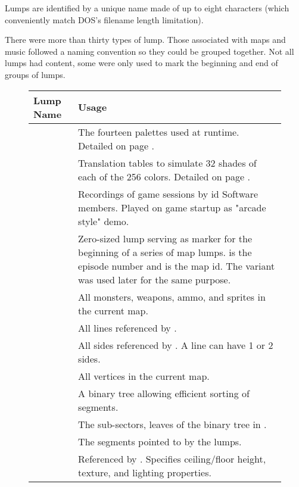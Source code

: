 Lumps are identified by a unique name made of up to eight characters (which conveniently match DOS's filename length limitation).\\
\par
{}
\par
There were more than thirty types of lump. Those associated with maps and music followed a naming convention so they could be grouped together. Not all lumps had content, some were only used to mark the beginning and end of groups of lumps.
\pagebreak

\begin{figure}[H]
\centering  
\begin{tabularx}{\textwidth}{ L{0.2}  L{0.8}}
  \toprule
  \textbf{Lump Name} &  \textbf{Usage} \\
   
  \toprule 
   & The fourteen palettes used at runtime. Detailed on page \pageref{label_palettes}. \\
   & Translation tables to simulate 32 shades of each of the 256 colors. Detailed on page \pageref{diminishedlightning}. \\
   &  Recordings of game sessions by id Software members. Played on game startup as "arcade style" demo.\\
  \toprule
   & Zero-sized lump serving as marker for the beginning of a series of map lumps.  is the episode number and  is the map id. The  variant was used later for the same purpose.\\
   & All monsters, weapons, ammo, and sprites in the current map.\\
   & All lines referenced by .\\
   & All sides referenced by . A line can have 1 or 2 sides.\\
   & All vertices in the current map.\\
   & A binary tree allowing efficient sorting of segments. \\
   &  The sub-sectors, leaves of the binary tree in .  \\
   &  The segments pointed to by the  lumps.\\
   &  Referenced by . Specifies ceiling/floor height, texture, and lighting properties.\\
  

\end{tabularx}
\end{figure}
